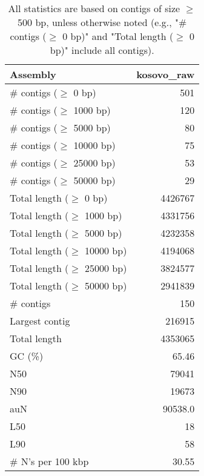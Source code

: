 \documentclass[12pt,a4paper]{article}
\begin{document}
\begin{table}[ht]
\begin{center}
\caption{All statistics are based on contigs of size $\geq$ 500 bp, unless otherwise noted (e.g., "\# contigs ($\geq$ 0 bp)" and "Total length ($\geq$ 0 bp)" include all contigs).}
\begin{tabular}{|l*{1}{|r}|}
\hline
Assembly & kosovo\_raw \\ \hline
\# contigs ($\geq$ 0 bp) & 501 \\ \hline
\# contigs ($\geq$ 1000 bp) & 120 \\ \hline
\# contigs ($\geq$ 5000 bp) & 80 \\ \hline
\# contigs ($\geq$ 10000 bp) & 75 \\ \hline
\# contigs ($\geq$ 25000 bp) & 53 \\ \hline
\# contigs ($\geq$ 50000 bp) & 29 \\ \hline
Total length ($\geq$ 0 bp) & 4426767 \\ \hline
Total length ($\geq$ 1000 bp) & 4331756 \\ \hline
Total length ($\geq$ 5000 bp) & 4232358 \\ \hline
Total length ($\geq$ 10000 bp) & 4194068 \\ \hline
Total length ($\geq$ 25000 bp) & 3824577 \\ \hline
Total length ($\geq$ 50000 bp) & 2941839 \\ \hline
\# contigs & 150 \\ \hline
Largest contig & 216915 \\ \hline
Total length & 4353065 \\ \hline
GC (\%) & 65.46 \\ \hline
N50 & 79041 \\ \hline
N90 & 19673 \\ \hline
auN & 90538.0 \\ \hline
L50 & 18 \\ \hline
L90 & 58 \\ \hline
\# N's per 100 kbp & 30.55 \\ \hline
\end{tabular}
\end{center}
\end{table}
\end{document}
